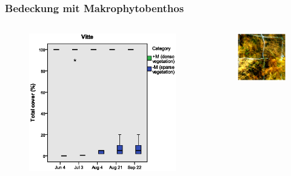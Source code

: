 \documentclass[xcolor=dvipsnames]{beamer}
\begin{document}
\begin{frame}
\frametitle{Bedeckung mit Makrophytobenthos}
\begin{columns}
\begin{column}{6cm}
\begin{figure}
\includegraphics[width=\textwidth]{images/total_cover/total_cover1.eps}
\end{figure}
\end{column}
\begin{column}{6cm}
\begin{overprint}
\begin{figure}
\includegraphics[width=\textwidth]{images/plotpictures/V+M.png}
\end{figure}


\end{overprint}
\end{column}
\end{columns}
\end{frame}
\end{document}
